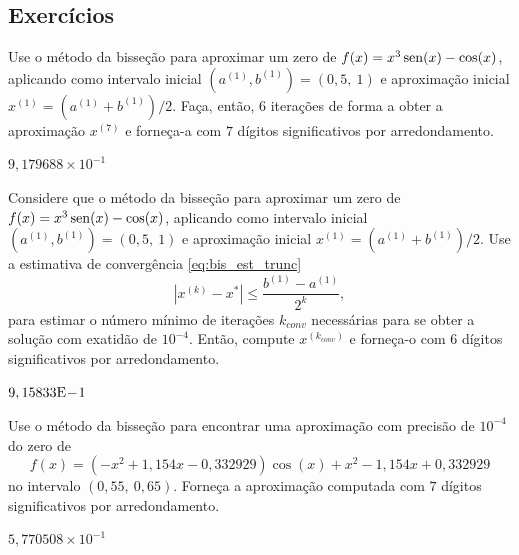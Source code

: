 \begin{ex}
% 
\end{ex}

\subsection*{Exercícios}

\begin{exer}\label{exer:bis_1}
  Use o método da bisseção para aproximar um zero de $f(x)=x^3\operatorname{sen}(x)-\cos(x)$, aplicando como intervalo inicial $(a^{(1)}, b^{(1)}) = (0,5, ~1)$ e aproximação inicial $x^{(1)}=(a^{(1)}+b^{(1)})/2$. Faça, então, $6$ iterações de forma a obter a aproximação $x^{(7)}$ e forneça-a com $7$ dígitos significativos por arredondamento.
\end{exer}
\begin{resp}
  $9,179688\times 10^{-1}$
\end{resp}

\begin{exer}\label{exer:bis_est_trunc}
  Considere que o método da bisseção para aproximar um zero de $f(x)=x^3\operatorname{sen}(x)-\cos(x)$, aplicando como intervalo inicial $(a^{(1)}, b^{(1)}) = (0,5, ~1)$ e aproximação inicial $x^{(1)}=(a^{(1)}+b^{(1)})/2$. Use a estimativa de convergência \eqref{eq:bis_est_trunc}
  \begin{equation}
    \left|x^{(k)} - x^{*}\right| \leq \frac{b^{(1)}-a^{(1)}}{2^k},
  \end{equation}
para estimar o número mínimo de iterações $k_{conv}$ necessárias para se obter a solução com exatidão de $10^{-4}$. Então, compute $x^{(k_{conv})}$ e forneça-o com $6$ dígitos significativos por arredondamento.
\end{exer}
\begin{resp}
  $9,15833\mathrm{E}\!-\!1$
\end{resp}

\begin{exer}\label{exer:bis_multpar}
  Use o método da bisseção para encontrar uma aproximação com precisão de $10^{-4}$ do zero de
  \begin{equation}
    f(x) = (-x^2+1,154x-0,332929)\cos(x) + x^2 - 1,154x + 0,332929
  \end{equation}
no intervalo $(0,55, ~0,65)$. Forneça a aproximação computada com $7$ dígitos significativos por arredondamento.
\end{exer}
\begin{resp}
  $5,770508\times 10^{-1}$
\end{resp}


